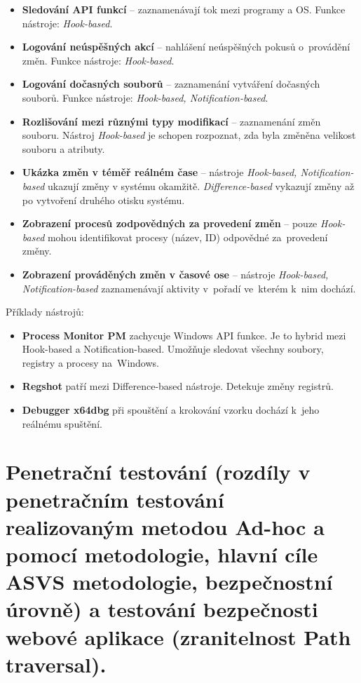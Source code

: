 \begin{itemize}
    \item \textbf{Sledování API funkcí} -- zaznamenávají tok mezi programy a OS.
    Funkce nástroje: \textit{Hook-based}.
    \item \textbf{Logování neúspěšných akcí} -- nahlášení neúspěšných pokusů o~provádění změn.
    Funkce nástroje: \textit{Hook-based}.
    \item \textbf{Logování dočasných souborů} -- zaznamenání vytváření dočasných souborů.
    Funkce nástroje: \textit{Hook-based, Notification-based}.
    \item \textbf{Rozlišování mezi různými typy modifikací} -- zaznamenání změn souboru.
    Nástroj \textit{Hook-based} je schopen rozpoznat, zda byla změněna velikost souboru a atributy.
    \item \textbf{Ukázka změn v téměř reálném čase} -- nástroje \textit{Hook-based, Notification-based} ukazují změny v systému okamžitě.
    \textit{Difference-based} vykazují změny až po vytvoření druhého otisku systému.
    \item \textbf{Zobrazení procesů zodpovědných za provedení změn} -- pouze \textit{Hook-based} mohou identifikovat procesy (název, ID) odpovědné za~provedení změny.
    \item \textbf{Zobrazení prováděných změn v časové ose} -- nástroje \textit{Hook-based, Notification-based} zaznamenávají aktivity v~pořadí ve~kterém k~nim dochází.
\end{itemize}

Příklady nástrojů:

\begin{itemize}
    \item
    	\textbf{Process Monitor PM} zachycuje Windows API funkce.
    	Je to hybrid mezi Hook-based a Notification-based.
    	Umožňuje sledovat všechny soubory, registry a procesy na~Windows.
    \item
    	\textbf{Regshot} patří mezi Difference-based nástroje.
    	Detekuje změny registrů.
    \item
    	\textbf{Debugger x64dbg} při spouštění a krokování vzorku dochází k~jeho reálnému spuštění.
\end{itemize}



\clearpage
\section{Penetrační testování (rozdíly v penetračním testování realizovaným metodou Ad-hoc a pomocí metodologie, hlavní cíle ASVS metodologie, bezpečnostní úrovně) a testování bezpečnosti webové aplikace (zranitelnost Path traversal).}

